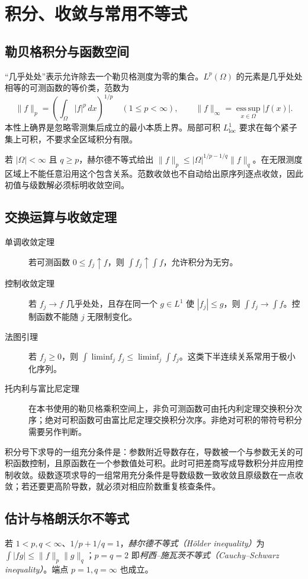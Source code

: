 \setcounter{chapter}{1} %
\chapter{积分、收敛与常用不等式}
\label{app:analysis}

\section{勒贝格积分与函数空间}
“几乎处处”表示允许除去一个勒贝格测度为零的集合。$L^p(\Omega)$ 的元素是几乎处处相等的可测函数的等价类，范数为
\[
 \|f\|_p=\left(\int_\Omega|f|^p\,dx\right)^{1/p}\quad(1\le p<\infty),\qquad
 \|f\|_\infty=\operatorname*{ess\,sup}_{x\in\Omega}|f(x)|.
\]
本性上确界是忽略零测集后成立的最小本质上界。局部可积 $L^1_{\mathrm{loc}}$ 要求在每个紧子集上可积，不要求全区域积分有限。

若 $|\Omega|<\infty$ 且 $q\ge p$，赫尔德不等式给出 $\|f\|_p\le|\Omega|^{1/p-1/q}\|f\|_q$。在无限测度区域上不能任意沿用这个包含关系。范数收敛也不自动给出原序列逐点收敛，因此初值与级数解必须标明收敛空间。

\section{交换运算与收敛定理}
\begin{description}
 \item[单调收敛定理] 若可测函数 $0\le f_j\uparrow f$，则 $\int f_j\uparrow\int f$，允许积分为无穷。
 \item[控制收敛定理] 若 $f_j\to f$ 几乎处处，且存在同一个 $g\in L^1$ 使 $|f_j|\le g$，则 $\int f_j\to\int f$。控制函数不能随 $j$ 无限制变化。
 \item[法图引理] 若 $f_j\ge0$，则 $\int\liminf_j f_j\le\liminf_j\int f_j$。这类下半连续关系常用于极小化序列。
 \item[托内利与富比尼定理] 在本书使用的勒贝格乘积空间上，非负可测函数可由托内利定理交换积分次序；绝对可积函数可由富比尼定理交换积分次序。非绝对可积的带符号积分需要另作判断。
\end{description}

积分号下求导的一组充分条件是：参数附近导数存在，导数被一个与参数无关的可积函数控制，且原函数在一个参数值处可积。此时可把差商写成导数积分并应用控制收敛。级数逐项求导的一组常用充分条件是导数级数一致收敛且原级数在一点收敛；若还要更高阶导数，就必须对相应阶数重复核查条件。

\section{估计与格朗沃尔不等式}
若 $1<p,q<\infty$、$1/p+1/q=1$，\emph{赫尔德不等式（H\"older inequality）}为 $\int|fg|\le\|f\|_p\|g\|_q$；$p=q=2$ 即\emph{柯西--施瓦茨不等式（Cauchy--Schwarz inequality）}。端点 $p=1,q=\infty$ 也成立。

